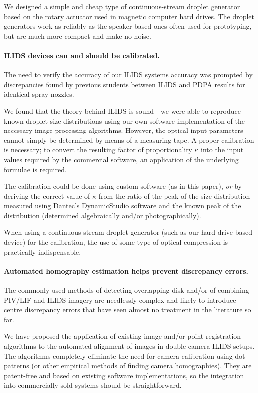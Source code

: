 \documentclass[11.5pt,oneside]{book}
\begin{document}
We designed a simple and cheap type of continuous-stream droplet
generator based on the rotary actuator used in magnetic computer hard
drives. The droplet generators work as reliably as the speaker-based
ones often used for prototyping, but are much more compact and make no
noise.

\paragraph{ILIDS devices can and should be calibrated.}
The need to verify the accuracy of our ILIDS systems accuracy was
prompted by discrepancies found by previous students between ILIDS and
PDPA results for identical spray nozzles.

We found that the theory behind ILIDS is sound---we were able to reproduce known
droplet size distributions using our
own software implementation of the necessary image processing algorithms.
However, the optical input parameters cannot simply be determined by means of
a measuring tape. A proper calibration is necessary; to convert the resulting
factor of proportionality $\kappa$ into the input values required by the commercial
software, an application of the underlying formulae is required.

The calibration
could be done using custom software (as in this paper), \emph{or} by deriving the
correct value of $\kappa$ from the ratio of the peak of the size distribution measured using
Dantec's DynamicStudio software and the known peak of the distribution
(determined algebraically and/or photographically).

When using a continuous-stream droplet generator (such as our hard-drive based
device) for the calibration, the use of some type of optical compression is
practically indispensable.

\paragraph{Automated homography estimation helps prevent discrepancy
errors.} The commonly used methods of detecting overlapping disk and/or
of combining PIV/LIF and ILIDS imagery are needlessly complex and
likely to introduce centre discrepancy errors that have seen almost
no treatment in the literature so far.

We have proposed the application of existing image and/or point
registration algorithms to the automated alignment of images in
double-camera ILIDS setups. The algorithms completely eliminate the need for
camera calibration using dot patterns (or other empirical methods of finding
camera homographies). They are patent-free and based on existing software
implementations, so the integration into commercially sold systems should be
straightforward.
\end{document}
